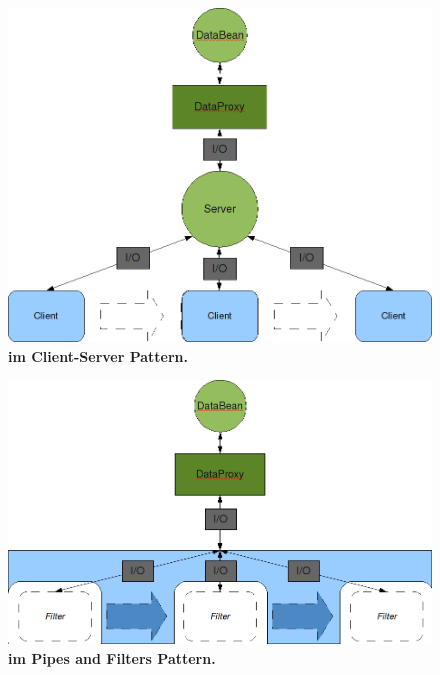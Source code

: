 \begin{figure}[htbp]
	\begin{center}
		\includegraphics[scale=0.55]{pics/serverClientData2.png}
	\caption[ im Client-Server Pattern]{
	\textbf{ im Client-Server Pattern.}
	}
	\end{center}
	\label{fig:pipesFilter41}
\end{figure}

\begin{figure}[htbp]
	\begin{center}
		\includegraphics[scale=0.55]{pics/pipesFilter41.png}
	\caption[ im Pipes and Filters Pattern]{
	\textbf{ im Pipes and Filters Pattern.}
	}
	\end{center}
	\label{fig:pipesFilter41}
\end{figure}

